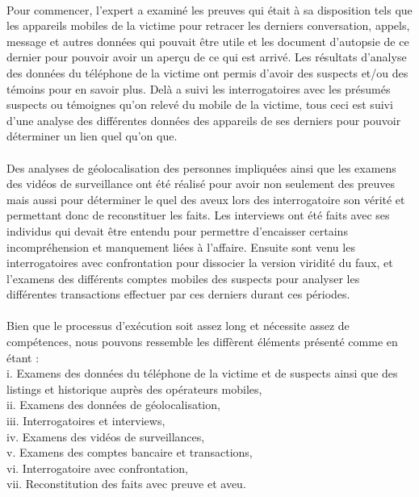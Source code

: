 \documentclass[]{article}
\begin{document}
\paragraph{}
Pour commencer, l’expert a examiné les preuves qui était à sa disposition tels que les appareils mobiles de la victime pour retracer les derniers conversation, appels, message et autres données qui pouvait être utile et les document d’autopsie de ce dernier pour pouvoir avoir un aperçu de ce qui est arrivé. Les résultats d’analyse des données du téléphone de la victime ont permis d’avoir des suspects et/ou des témoins pour en savoir plus. Delà a suivi les interrogatoires avec les présumés suspects ou témoignes qu’on relevé du mobile de la victime, tous ceci est suivi d’une analyse des différentes données des appareils de ses derniers pour pouvoir déterminer un lien quel qu’on que.
\paragraph{}
Des analyses de géolocalisation des personnes impliquées ainsi que les examens des vidéos de surveillance ont été réalisé pour avoir non seulement des preuves mais aussi pour déterminer le quel des aveux lors des interrogatoire son vérité et permettant donc de reconstituer les faits. Les interviews ont été faits avec ses individus qui devait être entendu pour permettre d’encaisser certains incompréhension et manquement liées à l’affaire. Ensuite sont venu les interrogatoires avec confrontation pour dissocier la version viridité du faux, et l’examens des différents comptes mobiles des suspects pour analyser les différentes transactions effectuer par ces derniers durant ces périodes.

\paragraph{}
Bien que le processus d’exécution soit assez long et nécessite assez de compétences, nous pouvons ressemble les diffèrent éléments présenté comme en étant :\\
i.	Examens des données du téléphone de la victime et de suspects ainsi que des listings et historique auprès des opérateurs mobiles,\\
ii.	Examens des données de géolocalisation,\\
iii.	Interrogatoires et interviews,\\
iv.	Examens des vidéos de surveillances,\\
v.	Examens des comptes bancaire et transactions,\\
vi.	Interrogatoire avec confrontation,\\
vii.	Reconstitution des faits avec preuve et aveu.\\
\end{document}

